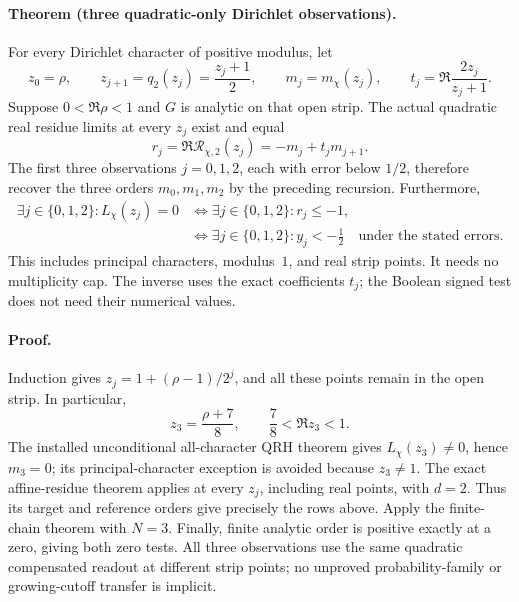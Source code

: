 \paragraph{Theorem (three quadratic-only Dirichlet observations).}
For every Dirichlet character of positive modulus, let
\[
 z_0=\rho,\qquad z_{j+1}=q_2(z_j)=\frac{z_j+1}{2},\qquad
 m_j=m_\chi(z_j),\qquad
 t_j=\Re\frac{2z_j}{z_j+1}.
\]
Suppose \(0<\Re\rho<1\) and \(G\) is analytic on that open strip. The
actual quadratic real residue limits at every \(z_j\) exist and equal
\[
 r_j=\Re\mathcal R_{\chi,2}(z_j)=-m_j+t_jm_{j+1}.
\]
The first three observations \(j=0,1,2\), each with error below \(1/2\),
therefore recover the three orders \(m_0,m_1,m_2\) by the preceding recursion.
Furthermore,
\begin{align*}
 \exists j\in\{0,1,2\}: L_\chi(z_j)=0
 &\iff \exists j\in\{0,1,2\}: r_j\le-1,\\
 &\iff \exists j\in\{0,1,2\}: y_j<-\frac12
       \quad\text{under the stated errors}.
\end{align*}
This includes principal characters, modulus~\(1\), and real strip points.
It needs no multiplicity cap. The inverse uses the exact coefficients
\(t_j\); the Boolean signed test does not need their numerical values.

\paragraph{Proof.}
Induction gives \(z_j=1+(\rho-1)/2^j\), and all these points remain in the
open strip. In particular,
\[
 z_3=\frac{\rho+7}{8},\qquad \frac78<\Re z_3<1.
\]
The installed unconditional all-character QRH theorem gives
\(L_\chi(z_3)\ne0\), hence \(m_3=0\); its principal-character exception
is avoided because \(z_3\ne1\). The exact affine-residue theorem applies
at every \(z_j\), including real points, with \(d=2\). Thus its target
and reference orders give precisely the rows above. Apply the finite-chain
theorem with \(N=3\). Finally, finite analytic order is positive exactly
at a zero, giving both zero tests. All three observations use the same
quadratic compensated readout at different strip points; no unproved
probability-family or growing-cutoff transfer is implicit.

